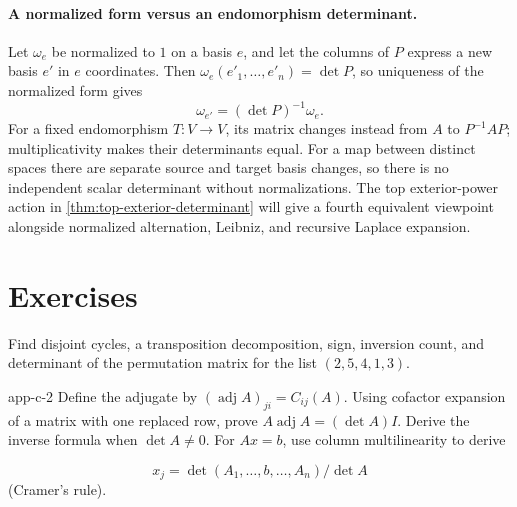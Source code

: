 \paragraph{A normalized form versus an endomorphism determinant.}
Let $\omega_e$ be normalized to $1$ on a basis $e$, and let the columns
of $P$ express a new basis $e'$ in $e$ coordinates. Then
$\omega_e(e'_1,\ldots,e'_n)=\det P$, so uniqueness of the normalized form gives
\[
\omega_{e'}=(\det P)^{-1}\omega_e.
\]
For a fixed endomorphism $T:V\to V$, its matrix changes instead from
$A$ to $P^{-1}AP$; multiplicativity makes their determinants equal.
For a map between distinct spaces there are separate source and target
basis changes, so there is no independent scalar determinant without
normalizations. The top exterior-power action in
\cref{thm:top-exterior-determinant} will give a fourth equivalent viewpoint
alongside normalized alternation, Leibniz, and recursive Laplace expansion.

\section*{Exercises}

\begin{exercise}
Find disjoint cycles, a transposition decomposition, sign, inversion count,
and determinant of the permutation matrix for the list $(2,5,4,1,3)$.
\end{exercise}
\begin{hexercise}{app-c-2}
Define the adjugate by $(\operatorname{adj}A)_{ji}=C_{ij}(A)$.
Using cofactor expansion of a matrix with one replaced row, prove
$A\operatorname{adj}A=(\det A)I$. Derive the inverse formula when
$\det A\ne0$. For $Ax=b$, use column multilinearity to derive

\[
x_j=\det(A_1,\ldots,b,\ldots,A_n)/\det A
\]
 (Cramer's rule).
\end{hexercise}

